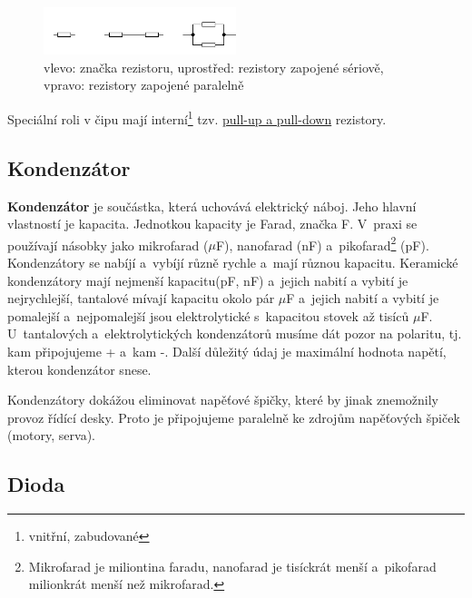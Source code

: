 \begin{figure}[h]
	\begin{center}
	\includegraphics[width=0.5\textwidth]{soubory/rezistory.jpg}		
	\end{center}
	\caption{ vlevo: značka rezistoru, uprostřed: rezistory zapojené sériově, vpravo: rezistory zapojené paralelně} 
	\label{fig:rezistory}
\end{figure}

Speciální roli v čipu mají interní\footnote{vnitřní, zabudované} tzv. 
\href{https://maly.gitbooks.io/hradla-volty-jednocipy/13_jak_naucit_kamen_pocitat/139_pull_up_apulldown.html}{pull-up a pull-down} rezistory. 


\subsection{Kondenzátor}

{\bf Kondenzátor} je součástka, která uchovává elektrický náboj. 
Jeho hlavní vlastností je kapacita. Jednotkou kapacity je Farad, značka F. 
V~praxi se používají násobky jako mikrofarad ($\mu$F), nanofarad (nF) a~pikofarad\footnote{Mikrofarad je miliontina faradu,
	 nanofarad je tisíckrát menší a~pikofarad milionkrát menší než mikrofarad.} (pF). 
	Kondenzátory se nabíjí a~vybíjí různě rychle a~mají různou kapacitu. Keramické kondenzátory 
  mají nejmenší kapacitu(pF, nF) a~jejich nabití a vybití je nejrychlejší, tantalové  
 mívají kapacitu okolo pár $\mu$F a~jejich nabití a vybití je pomalejší a~nejpomalejší 
jsou elektrolytické s~kapacitou stovek až tisíců $\mu$F. 
U~tantalových a~elektrolytických kondenzátorů musíme dát pozor na polaritu, tj. kam připojujeme + a~kam -. 
Další důležitý údaj je maximální hodnota napětí, kterou kondenzátor snese. 

Kondenzátory dokážou eliminovat napěťové špičky, které by jinak znemožnily provoz řídící desky. 
Proto je připojujeme paralelně ke zdrojům napěťových špiček (motory, serva).

\subsection{Dioda}

